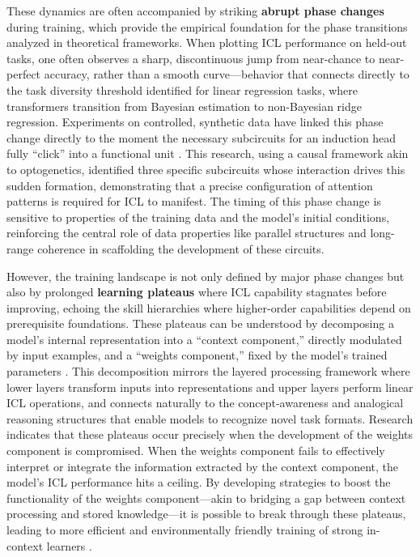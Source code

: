 \documentclass[11pt]{article}
\begin{document}
These dynamics are often accompanied by striking \textbf{abrupt phase changes} during training, which provide the empirical foundation for the phase transitions analyzed in theoretical frameworks. When plotting ICL performance on held-out tasks, one often observes a sharp, discontinuous jump from near-chance to near-perfect accuracy, rather than a smooth curve---behavior that connects directly to the task diversity threshold identified for linear regression tasks, where transformers transition from Bayesian estimation to non-Bayesian ridge regression. Experiments on controlled, synthetic data have linked this phase change directly to the moment the necessary subcircuits for an induction head fully ``click'' into a functional unit \cite{ref56}. This research, using a causal framework akin to optogenetics, identified three specific subcircuits whose interaction drives this sudden formation, demonstrating that a precise configuration of attention patterns is required for ICL to manifest. The timing of this phase change is sensitive to properties of the training data and the model's initial conditions, reinforcing the central role of data properties like parallel structures and long-range coherence in scaffolding the development of these circuits.

However, the training landscape is not only defined by major phase changes but also by prolonged \textbf{learning plateaus} where ICL capability stagnates before improving, echoing the skill hierarchies where higher-order capabilities depend on prerequisite foundations. These plateaus can be understood by decomposing a model's internal representation into a ``context component,'' directly modulated by input examples, and a ``weights component,'' fixed by the model's trained parameters \cite{ref74}. This decomposition mirrors the layered processing framework where lower layers transform inputs into representations and upper layers perform linear ICL operations, and connects naturally to the concept-awareness and analogical reasoning structures that enable models to recognize novel task formats. Research indicates that these plateaus occur precisely when the development of the weights component is compromised. When the weights component fails to effectively interpret or integrate the information extracted by the context component, the model's ICL performance hits a ceiling. By developing strategies to boost the functionality of the weights component---akin to bridging a gap between context processing and stored knowledge---it is possible to break through these plateaus, leading to more efficient and environmentally friendly training of strong in-context learners \cite{ref74}.
\end{document}

